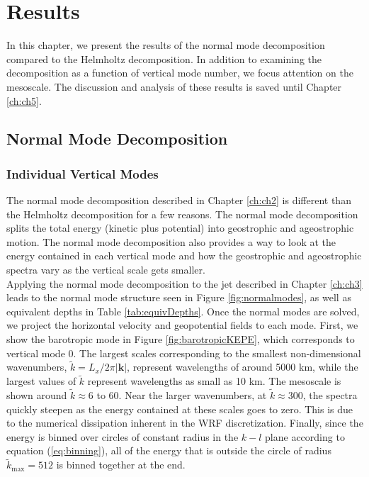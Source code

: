 \chapter{Results}
\label{ch:ch4}
In this chapter, we present the results of the normal mode decomposition compared to the Helmholtz decomposition. In addition to examining the decomposition as a function of vertical mode number, we focus attention on the mesoscale. The discussion and analysis of these results is saved until Chapter \ref{ch:ch5}.

\section{Normal Mode Decomposition}
\subsection{Individual Vertical Modes}
The normal mode decomposition described in Chapter \ref{ch:ch2} is different than the Helmholtz decomposition for a few reasons. The normal mode decomposition splits the total energy (kinetic plus potential) into geostrophic and ageostrophic motion. The normal mode decomposition also provides a way to look at the energy contained in each vertical mode and how the geostrophic and ageostrophic spectra vary as the vertical scale gets smaller.\\

Applying the normal mode decomposition to the jet described in Chapter \ref{ch:ch3} leads to the normal mode structure seen in Figure \ref{fig:normalmodes}, as well as equivalent depths in Table \ref{tab:equivDepths}. Once the normal modes are solved, we project the horizontal velocity and geopotential fields to each mode. First, we show the barotropic mode in Figure \ref{fig:barotropicKEPE}, which corresponds to vertical mode 0. The largest scales corresponding to the smallest non-dimensional wavenumbers, $\tilde{k} = L_x/2\pi |\mathbf{k}|$, represent wavelengths of around 5000 km, while the largest values of $\tilde{k}$ represent wavelengths as small as 10 km. The mesoscale is shown around $\tilde{k} \approx 6$ to 60. Near the larger wavenumbers, at  $\tilde{k} \approx 300$, the spectra quickly steepen as the energy contained at these scales goes to zero. This is due to the numerical dissipation inherent in the WRF discretization. Finally, since the energy is binned over circles of constant radius in the $k-l$ plane according to equation (\ref{eq:binning}), all of the energy that is outside the circle of radius $\tilde{k}_{\text{max}} = 512$ is binned together at the end.\\

